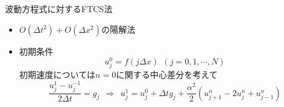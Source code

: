 \begin{frame}[t]{波動方程式に対するFTCS法}
  \begin{itemize}
  \item $O(\Delta t^2) + O(\Delta x^2)$の陽解法
    \begin{center}
    \end{center}
  \item 初期条件
    \[
    u_j^0 = f(j\Delta x) \ \ (j=0,1,\cdots,N)
    \]
    初期速度については$n=0$に関する中心差分を考えて
    \[
    \frac{u_j^1 - u_j^{-1}}{2 \Delta t} = g_j \ \ \Rightarrow \ \ u_j^1 = u_j^0 + \Delta t g_j + \frac{\alpha^2}{2} (u_{j+1}^{n} - 2 u_{j}^{n} + u_{j-1}^{n})
    \]
  \end{itemize}
\end{frame}
